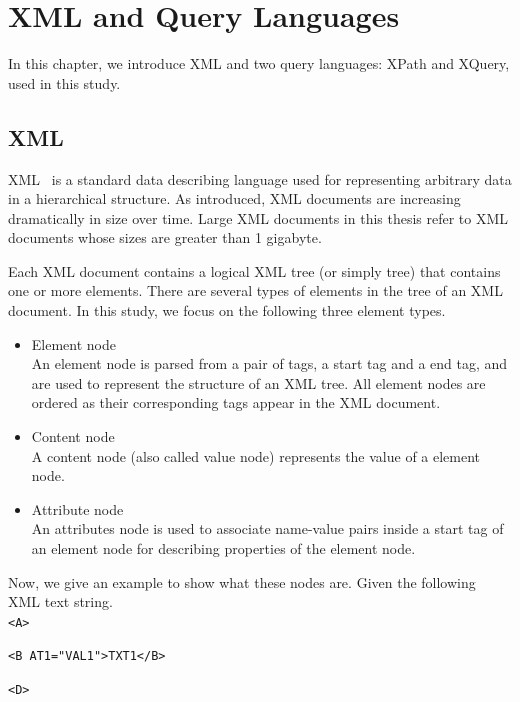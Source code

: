 \chapter{XML and Query Languages}

In this chapter, we introduce XML and two query languages: XPath and XQuery,
used in this study.


\section{XML}

XML~\cite{XML} is a standard data describing language used for representing
arbitrary data in a hierarchical structure. As introduced, XML documents are
increasing dramatically in size over time. Large XML documents in this thesis
refer to XML documents whose sizes are greater than 1 gigabyte.

Each XML document contains a logical XML tree (or simply tree) that contains one
or more elements.  There are several types of elements in the tree of an XML
document. In this study, we focus on the following three element types.

\begin{itemize}
	\item Element node \\
	An element node is parsed from a pair of tags, a start tag and a end tag, and
	are used to represent the structure of an XML tree. All element nodes are
	ordered as their corresponding tags appear in the XML document.
	\item Content node \\
	A content node (also called value node) represents the value of a element node.
	\item Attribute node \\
	An attributes node is used to associate name-value pairs inside a start tag of
	an element node for describing properties of the element node.
\end{itemize}


Now, we give an example to show what these nodes are. Given the following
XML text string.\\

\hspace{10ex}\texttt{<A>}

\hspace{14ex}\texttt{<B AT1="VAL1">TXT1</B>}

\hspace{14ex}\texttt{<D>}

